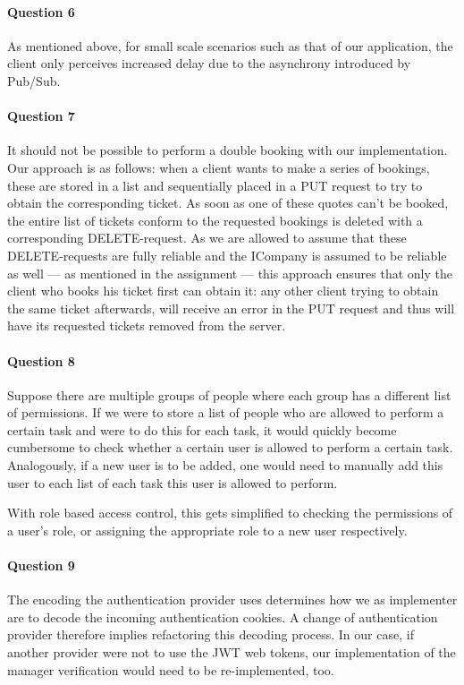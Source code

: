 \documentclass{ds-report}
\begin{document}
	\paragraph{Question 6}
	As mentioned above, for small scale scenarios such as that of our application, the client only perceives increased delay due to the asynchrony introduced by Pub/Sub.
	
	\paragraph{Question 7}
	It should not be possible to perform a double booking with our implementation. Our approach is as follows: when a client wants to make a series of bookings, these are stored in a list and sequentially placed in a PUT request to try to obtain the corresponding ticket. As soon as one of these quotes can't be booked, the entire list of tickets conform to the requested bookings is deleted with a corresponding DELETE-request. As we are allowed to assume that these DELETE-requests are fully reliable and the ICompany is assumed to be reliable as well --- as mentioned in the assignment --- this approach ensures that only the client who books his ticket first can obtain it: any other client trying to obtain the same ticket afterwards, will receive an error in the PUT request and thus will have its requested tickets removed from the server.
	
	\paragraph{Question 8} 
	Suppose there are multiple groups of people where each group has a different list of permissions. If we were to store a list of people who are allowed to perform a certain task and were to do this for each task, it would quickly become cumbersome to check whether a certain user is allowed to perform a certain task. Analogously, if a new user is to be added, one would need to manually add this user to each list of each task this user is allowed to perform.
	
	With role based access control, this gets simplified to checking the permissions of a user's role, or assigning the appropriate role to a new user respectively.
	
	\paragraph{Question 9}
	The encoding the authentication provider uses determines how we as implementer are to decode the incoming authentication cookies. A change of authentication provider therefore implies refactoring this decoding process. In our case, if another provider were not to use the JWT web tokens, our implementation of the manager verification would need to be re-implemented, too.
	
\end{document}
